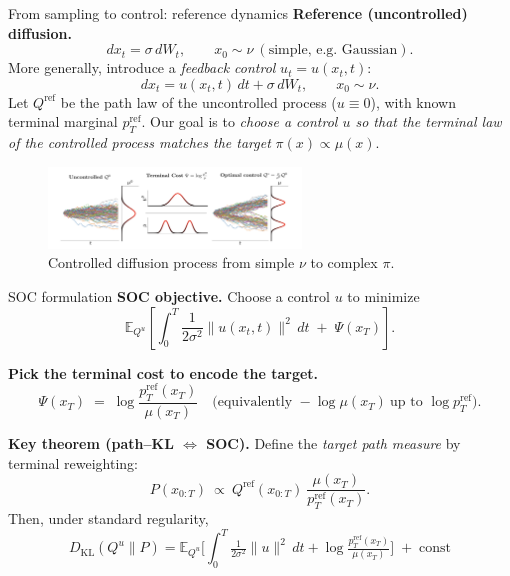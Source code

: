 \documentclass[aspectratio=169,xcolor=dvipsnames]{beamer}
\begin{document}
\begin{frame}[t]{From sampling to control: reference dynamics}
\footnotesize
\textbf{Reference (uncontrolled) diffusion.}
\[
dx_t=\sigma\,dW_t,\qquad x_0\sim \nu \ (\text{simple, e.g.\ Gaussian}).
\]
More generally, introduce a \emph{feedback control} $u_t=u(x_t,t)$:
\[
dx_t=u(x_t,t)\,dt+\sigma\,dW_t,\qquad x_0\sim \nu .
\]
Let $Q^{\text{ref}}$ be the path law of the uncontrolled process ($u\equiv 0$), with known terminal marginal $p_T^{\text{ref}}$.
Our goal is to \emph{choose a control $u$ so that the terminal law of the controlled process matches the target} $\pi(x)\propto \mu(x)$.

\begin{figure}
    \centering
    \includegraphics[width=0.6\textwidth]{figures/unconctrolled.png}
    \caption{Controlled diffusion process from simple $\nu$ to complex $\pi$.}
\end{figure}


\end{frame}

\begin{frame}[t]{SOC formulation}
\scriptsize
\textbf{SOC objective.} Choose a control $u$ to minimize
\[
\mathbb E_{Q^u}\!\left[\int_0^T \frac{1}{2\sigma^2}\|u(x_t,t)\|^2\,dt \;+\; \Psi(x_T)\right].
\]

\textbf{Pick the terminal cost to encode the target.}
\[
\Psi(x_T)\;=\;\log\frac{p_T^{\text{ref}}(x_T)}{\mu(x_T)}\quad
\big(\text{equivalently }-\log\mu(x_T)\ \text{up to } \log p_T^{\text{ref}}\big).
\]

\textbf{Key theorem (path--KL $\Leftrightarrow$ SOC).}
Define the \emph{target path measure} by terminal reweighting:
\[
P(x_{0:T})\ \propto\ Q^{\text{ref}}(x_{0:T})\ \frac{\mu(x_T)}{p_T^{\text{ref}}(x_T)}.
\]
Then, under standard regularity,
\[
\boxed{\;
D_{\mathrm{KL}}(Q^u\|P)
=\mathbb E_{Q^u}\!\Big[\int_0^T \tfrac{1}{2\sigma^2}\|u\|^2\,dt+\log\tfrac{p_T^{\text{ref}}(x_T)}{\mu(x_T)}\Big]\;+\;\text{const}
\;}
\]

\end{frame}
\end{document}
